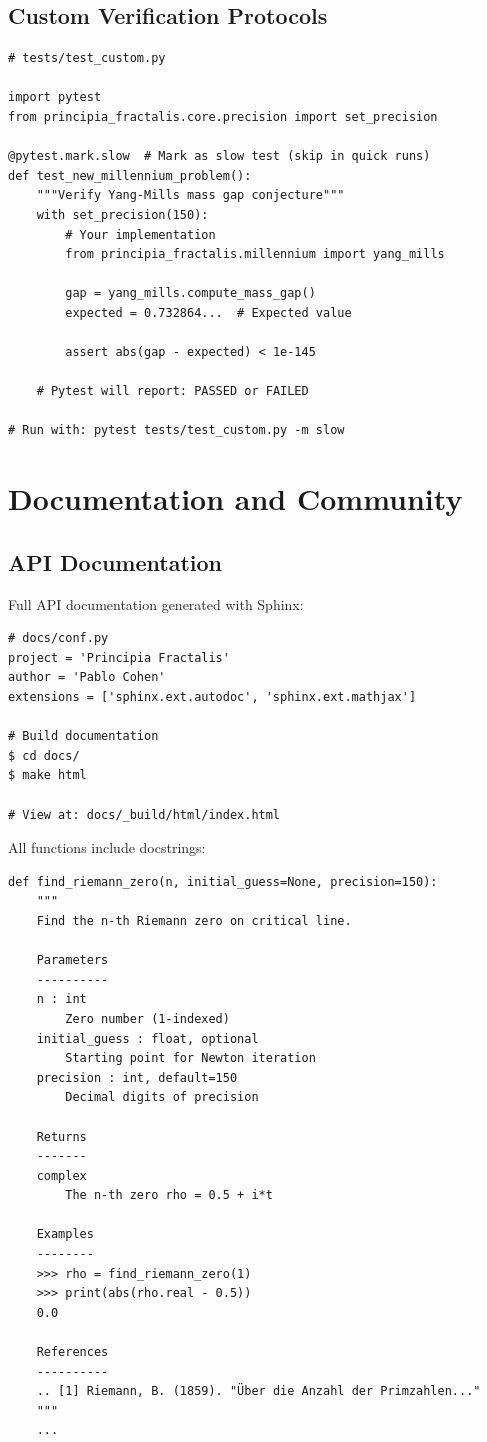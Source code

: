 \subsection{Custom Verification Protocols}

\begin{verbatim}
# tests/test_custom.py

import pytest
from principia_fractalis.core.precision import set_precision

@pytest.mark.slow  # Mark as slow test (skip in quick runs)
def test_new_millennium_problem():
    """Verify Yang-Mills mass gap conjecture"""
    with set_precision(150):
        # Your implementation
        from principia_fractalis.millennium import yang_mills

        gap = yang_mills.compute_mass_gap()
        expected = 0.732864...  # Expected value

        assert abs(gap - expected) < 1e-145

    # Pytest will report: PASSED or FAILED

# Run with: pytest tests/test_custom.py -m slow
\end{verbatim}

\section{Documentation and Community}
\label{sec:documentation}

\subsection{API Documentation}

Full API documentation generated with Sphinx:

\begin{verbatim}
# docs/conf.py
project = 'Principia Fractalis'
author = 'Pablo Cohen'
extensions = ['sphinx.ext.autodoc', 'sphinx.ext.mathjax']

# Build documentation
$ cd docs/
$ make html

# View at: docs/_build/html/index.html
\end{verbatim}

All functions include docstrings:
\begin{verbatim}
def find_riemann_zero(n, initial_guess=None, precision=150):
    """
    Find the n-th Riemann zero on critical line.

    Parameters
    ----------
    n : int
        Zero number (1-indexed)
    initial_guess : float, optional
        Starting point for Newton iteration
    precision : int, default=150
        Decimal digits of precision

    Returns
    -------
    complex
        The n-th zero rho = 0.5 + i*t

    Examples
    --------
    >>> rho = find_riemann_zero(1)
    >>> print(abs(rho.real - 0.5))
    0.0

    References
    ----------
    .. [1] Riemann, B. (1859). "Über die Anzahl der Primzahlen..."
    """
    ...
\end{verbatim}

